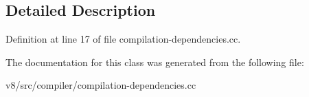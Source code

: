 \subsection{Detailed Description}


Definition at line 17 of file compilation-\/dependencies.\+cc.



The documentation for this class was generated from the following file\+:\begin{DoxyCompactItemize}
\item 
v8/src/compiler/compilation-\/dependencies.\+cc\end{DoxyCompactItemize}
